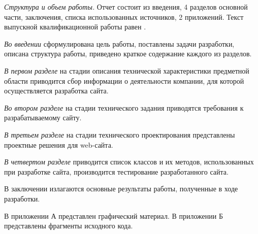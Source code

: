 \emph{Структура и объем работы.} Отчет состоит из введения, 4 разделов основной части, заключения, списка использованных источников, 2 приложений. Текст выпускной квалификационной работы равен .

\emph{Во введении} сформулирована цель работы, поставлены задачи разработки, описана структура работы, приведено краткое содержание каждого из разделов.

\emph{В первом разделе} на стадии описания технической характеристики предметной области приводится сбор информации о деятельности компании, для которой осуществляется разработка сайта.

\emph{Во втором разделе} на стадии технического задания приводятся требования к разрабатываемому сайту.

\emph{В третьем разделе} на стадии технического проектирования представлены проектные решения для web-сайта.

\emph{В четвертом разделе} приводится список классов и их методов, использованных при разработке сайта, производится тестирование разработанного сайта.

В заключении излагаются основные результаты работы, полученные в ходе разработки.

В приложении А представлен графический материал.
В приложении Б представлены фрагменты исходного кода. 
